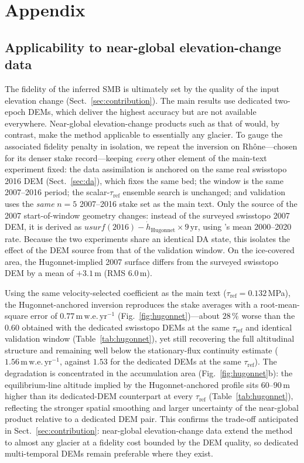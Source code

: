 \appendix
\section{Appendix}

\subsection{Applicability to near-global elevation-change data}\label{app:hugonnet}

The fidelity of the inferred SMB is ultimately set by the quality of the input
elevation change (Sect.~\ref{sec:contribution}). The main results use dedicated
two-epoch DEMs, which deliver the highest accuracy but are not available everywhere.
Near-global elevation-change products such as that of \citet{hugonnet2021} would, by
contrast, make the method applicable to essentially any glacier. To gauge the
associated fidelity penalty in isolation, we repeat the inversion on
Rhône---chosen for its denser stake record---keeping \emph{every} other element of
the main-text experiment fixed: the data assimilation is anchored on the same real
swisstopo 2016 DEM (Sect.~\ref{sec:da}), which fixes the same bed; the window is the
same 2007--2016 period; the scalar-$\tau_{\mathrm{ref}}$ ensemble search is
unchanged; and validation uses the \emph{same} $n=5$ 2007--2016 stake set as the
main text. Only the source of the 2007 start-of-window geometry changes: instead of
the surveyed swisstopo 2007 DEM, it is derived as $usurf(2016) -
\dot{h}_{\mathrm{Hugonnet}}\times 9\,\mathrm{yr}$, using \citet{hugonnet2021}'s mean
2000--2020 rate. Because the two experiments share an identical DA state, this
isolates the effect of the DEM source from that of the validation window. On the
ice-covered area, the Hugonnet-implied 2007 surface differs from the surveyed
swisstopo DEM by a mean of $+3.1\,\mathrm{m}$ (RMS $6.0\,\mathrm{m}$).

Using the same velocity-selected coefficient as the main text
($\tau_{\mathrm{ref}}=0.132$\,MPa), the Hugonnet-anchored inversion reproduces the
stake averages with a root-mean-square error of $0.77\,\mathrm{m\,w.e.\,yr^{-1}}$
(Fig.~\ref{fig:hugonnet})---about $28\,\%$ worse than the $0.60$ obtained with the
dedicated swisstopo DEMs at the same $\tau_{\mathrm{ref}}$ and identical validation
window (Table~\ref{tab:hugonnet}), yet still recovering the full altitudinal
structure and remaining well below the stationary-flux continuity estimate
($1.56\,\mathrm{m\,w.e.\,yr^{-1}}$, against $1.53$ for the dedicated DEMs at the
same $\tau_{\mathrm{ref}}$). The degradation is concentrated in the accumulation
area (Fig.~\ref{fig:hugonnet}b): the equilibrium-line altitude implied by the
Hugonnet-anchored profile sits $60$--$90\,\mathrm{m}$ higher than its dedicated-DEM
counterpart at every $\tau_{\mathrm{ref}}$ (Table~\ref{tab:hugonnet}), reflecting the
stronger spatial smoothing and larger uncertainty of the near-global product
relative to a dedicated DEM pair. This confirms the trade-off anticipated in
Sect.~\ref{sec:contribution}: near-global elevation-change data extend the method to
almost any glacier at a fidelity cost bounded by the DEM quality, so dedicated
multi-temporal DEMs remain preferable where they exist. 


